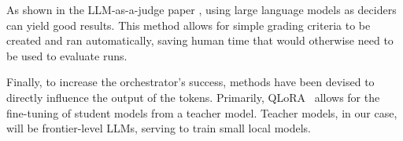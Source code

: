 

As shown in the LLM-as-a-judge paper \cite{zheng2023judging}, using large language models as deciders can yield good results.
This method allows for simple grading criteria to be created and ran automatically, saving human time that would otherwise need to be used to evaluate runs.


Finally, to increase the orchestrator's success, methods have been devised to directly influence the output of the tokens.
Primarily, QLoRA~\cite{dettmers2023qlora} allows for the fine-tuning of student models from a teacher model.
Teacher models, in our case, will be frontier-level LLMs, serving to train small local models.

